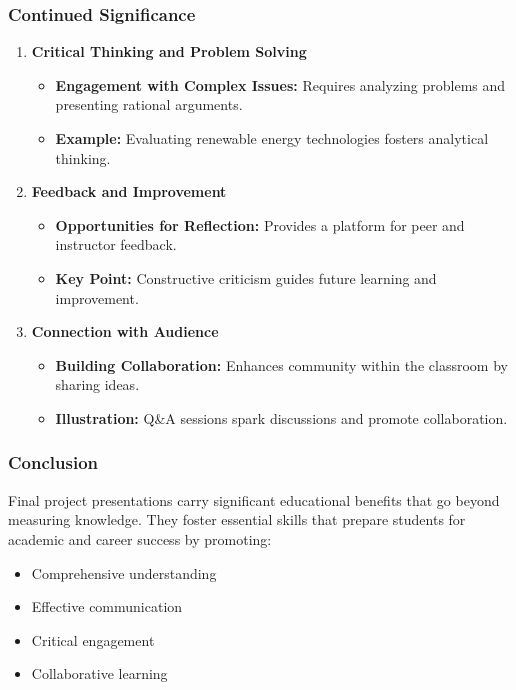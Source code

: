 \documentclass{beamer}
\begin{document}
\begin{frame}[fragile]
    \frametitle{Continued Significance}
    \begin{enumerate}[resume]
        \item \textbf{Critical Thinking and Problem Solving}
        \begin{itemize}
            \item \textbf{Engagement with Complex Issues:} Requires analyzing problems and presenting rational arguments.
            \item \textbf{Example:} Evaluating renewable energy technologies fosters analytical thinking.
        \end{itemize}

        \item \textbf{Feedback and Improvement}
        \begin{itemize}
            \item \textbf{Opportunities for Reflection:} Provides a platform for peer and instructor feedback.
            \item \textbf{Key Point:} Constructive criticism guides future learning and improvement.
        \end{itemize}

        \item \textbf{Connection with Audience}
        \begin{itemize}
            \item \textbf{Building Collaboration:} Enhances community within the classroom by sharing ideas.
            \item \textbf{Illustration:} Q\&A sessions spark discussions and promote collaboration.
        \end{itemize}
    \end{enumerate}
\end{frame}

\begin{frame}[fragile]
    \frametitle{Conclusion}
    Final project presentations carry significant educational benefits that go beyond measuring knowledge. They foster essential skills that prepare students for academic and career success by promoting:
    \begin{itemize}
        \item Comprehensive understanding
        \item Effective communication
        \item Critical engagement
        \item Collaborative learning
    \end{itemize}
\end{frame}
\end{document}
